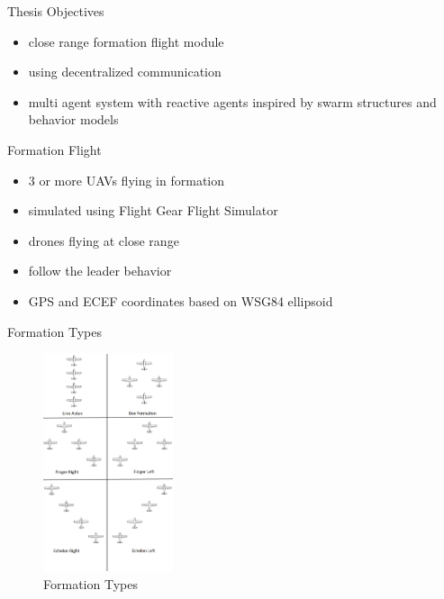 \documentclass{beamer}
\begin{document}
\begin{frame}{Thesis Objectives}
\begin{itemize}
\item close range formation flight module
\item using decentralized communication
\item multi agent system with reactive agents inspired by swarm structures and behavior models
\end{itemize}
\end{frame}

\begin{frame}{Formation Flight}
\begin{itemize}
\item 3 or more UAVs flying in formation
\item simulated using Flight Gear Flight Simulator
\item drones flying at close range
\item follow the leader behavior
\item GPS and ECEF coordinates based on WSG84 ellipsoid
\end{itemize}
\end{frame}

\begin{frame}{Formation Types}
\begin{center}
\begin{figure}[p]
\includegraphics[width=1.5in]{img/4form.png}
\caption {Formation Types}
\end{figure}
\end{center}
\end{frame}
\end{document}
